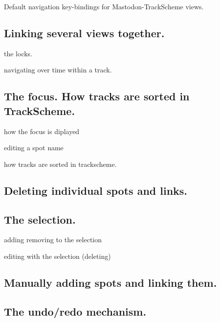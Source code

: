 \begin{table}[!htbp]
    \centering
    
    \caption{Default navigation key-bindings for Mastodon-TrackScheme views.}

    

    \label{tab:MastodonTrackSchemeNavigationKeys}
    \vspace{-10pt}

\end{table}


\subsection{Linking several views together.}

the locks.

navigating over time within a track.


\subsection{The focus. How tracks are sorted in TrackScheme.}

how the focus is diplayed

editing a spot name

how tracks are sorted in trackscheme.

\subsection{Deleting individual spots and links.}

\subsection{The selection.}

adding removing to the selection

editing with the selection (deleting)

\subsection{Manually adding spots and linking them.}

\subsection{The undo/redo mechanism.}





